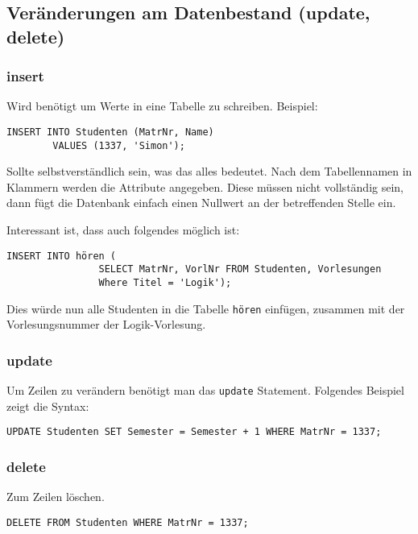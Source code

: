 \subsection{Veränderungen am Datenbestand (update, delete)}

\subsubsection{insert}
Wird benötigt um Werte in eine Tabelle zu schreiben. Beispiel:

\begin{lstlisting}[caption={Beispiel mit Insert}]
    INSERT INTO Studenten (MatrNr, Name)
        VALUES (1337, 'Simon');
\end{lstlisting}

Sollte selbstverständlich sein, was das alles bedeutet. Nach dem Tabellennamen in Klammern werden die Attribute angegeben. Diese müssen nicht vollständig sein, dann fügt die Datenbank einfach einen Nullwert an der betreffenden Stelle ein.

Interessant ist, dass auch folgendes möglich ist:
\begin{lstlisting}[caption={Beispiel mit Insert aus anderer Tabelle}]
    INSERT INTO hören (
                SELECT MatrNr, VorlNr FROM Studenten, Vorlesungen
                Where Titel = 'Logik');
\end{lstlisting}
Dies würde nun alle Studenten in die Tabelle \texttt{hören} einfügen, zusammen mit der Vorlesungsnummer der Logik-Vorlesung.

\subsubsection{update}
Um Zeilen zu verändern benötigt man das \texttt{update} Statement. Folgendes Beispiel zeigt die Syntax:

\begin{lstlisting}[caption={update Beispiel}]
    UPDATE Studenten SET Semester = Semester + 1 WHERE MatrNr = 1337;
\end{lstlisting}

\subsubsection{delete}
Zum Zeilen löschen.

\begin{lstlisting}[caption={delete Beispiel}]
    DELETE FROM Studenten WHERE MatrNr = 1337;
\end{lstlisting}

